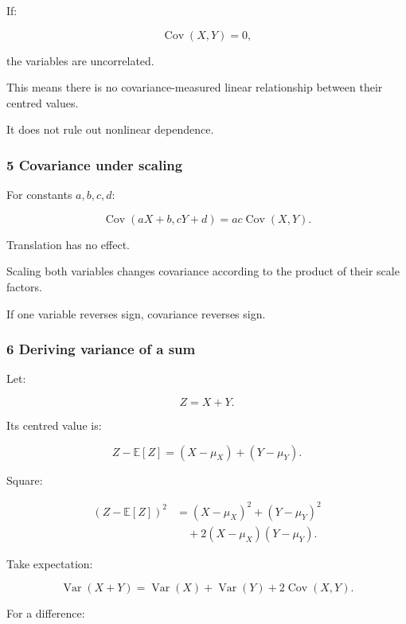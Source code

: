 \hypertarget{02-foundations-ii-ch023-zero-covariance}{}

If:

\[
 \operatorname{Cov}(X,Y)=0,
\]

the variables are uncorrelated.

This means there is no covariance-measured linear relationship between their centred values.

It does not rule out nonlinear dependence.

\subsubsection{5 Covariance under scaling}\label{02-foundations-ii-ch023-covariance-under-scaling}

\hypertarget{02-foundations-ii-ch023-covariance-under-scaling}{}

For constants \(a,b,c,d\):

\[
 \boxed{ \operatorname{Cov}(aX+b,cY+d) = ac\operatorname{Cov}(X,Y) }.
\]

Translation has no effect.

Scaling both variables changes covariance according to the product of their scale factors.

If one variable reverses sign, covariance reverses sign.

\subsubsection{6 Deriving variance of a sum}\label{02-foundations-ii-ch023-deriving-variance-of-a-sum}

\hypertarget{02-foundations-ii-ch023-deriving-variance-of-a-sum}{}

Let:

\[
 Z=X+Y.
\]

Its centred value is:

\[
 Z-\mathbb E[Z] = (X-\mu_X)+(Y-\mu_Y).
\]

Square:

\[
 \begin{aligned} (Z-\mathbb E[Z])^2 &=(X-\mu_X)^2+(Y-\mu_Y)^2\\ &\quad+2(X-\mu_X)(Y-\mu_Y). \end{aligned}
\]

Take expectation:

\[
 \boxed{ \operatorname{Var}(X+Y) = \operatorname{Var}(X)+ \operatorname{Var}(Y)+ 2\operatorname{Cov}(X,Y) }.
\]

For a difference:

